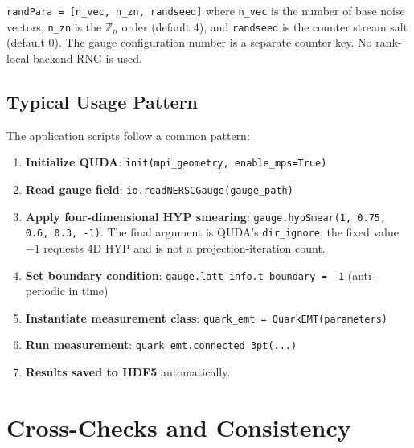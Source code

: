 \documentclass[11pt,a4paper]{article}
\newcommand{\znum}{\mathbb{Z}_n}
\newcommand{\code}[1]{\texttt{#1}}
\begin{document}
\code{randPara = [n\_vec, n\_zn, randseed]} where \code{n\_vec} is the
number of base noise vectors, \code{n\_zn} is the $\znum$ order (default 4),
and \code{randseed} is the counter stream salt (default 0).  The gauge
configuration number is a separate counter key.  No rank-local backend RNG is
used.

\subsection{Typical Usage Pattern}
\label{sec:usage}

The application scripts follow a common pattern:

\begin{enumerate}[nosep]
  \item \textbf{Initialize QUDA}: \code{init(mpi\_geometry, enable\_mps=True)}
  \item \textbf{Read gauge field}: \code{io.readNERSCGauge(gauge\_path)}
  \item \textbf{Apply four-dimensional HYP smearing}:
    \code{gauge.hypSmear(1, 0.75, 0.6, 0.3, -1)}.  The final argument is
    QUDA's \code{dir\_ignore}; the fixed value \(-1\) requests 4D HYP and is
    not a projection-iteration count.
  \item \textbf{Set boundary condition}: \code{gauge.latt\_info.t\_boundary = -1} (anti-periodic in time)
  \item \textbf{Instantiate measurement class}: \code{quark\_emt = QuarkEMT(parameters)}
  \item \textbf{Run measurement}: \code{quark\_emt.connected\_3pt(...)}
  \item \textbf{Results saved to HDF5} automatically.
\end{enumerate}


\section{Cross-Checks and Consistency}
\end{document}
